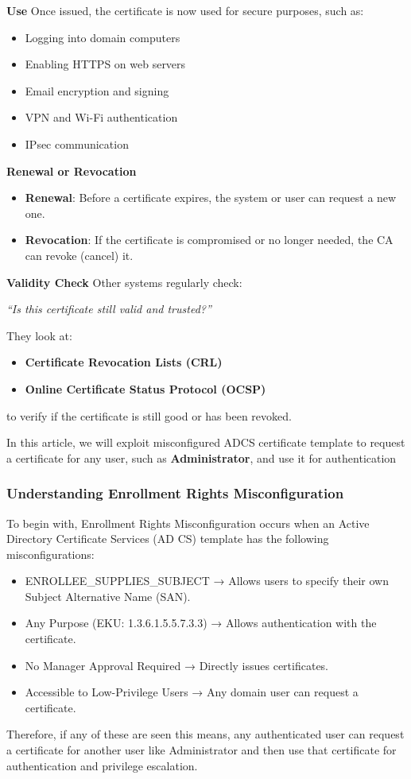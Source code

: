 \textbf{Use}
Once issued, the certificate is now used for secure purposes, such as:

\begin{itemize}
    \item Logging into domain computers
    \item Enabling HTTPS on web servers
    \item Email encryption and signing
    \item VPN and Wi-Fi authentication
    \item IPsec communication
\end{itemize}

\textbf{Renewal or Revocation}

\begin{itemize}
    \item \textbf{Renewal}: Before a certificate expires, the system or user can request a new one.
    \item \textbf{Revocation}: If the certificate is compromised or no longer needed, the CA can revoke (cancel) it.
\end{itemize}

\textbf{Validity Check}
Other systems regularly check:

\textit{“Is this certificate still valid and trusted?”}

They look at:

\begin{itemize}
    \item \textbf{Certificate Revocation Lists (CRL)}
    \item \textbf{Online Certificate Status Protocol (OCSP)}
\end{itemize}
to verify if the certificate is still good or has been revoked.

In this article, we will exploit misconfigured ADCS certificate template to request a certificate for any user, such as \textbf{Administrator}, and use it for authentication

\subsubsection{Understanding Enrollment Rights Misconfiguration}

To begin with, Enrollment Rights Misconfiguration occurs when an Active Directory Certificate Services (AD CS) template has the following misconfigurations:

\begin{itemize}
    \item ENROLLEE\_SUPPLIES\_SUBJECT → Allows users to specify their own Subject Alternative Name (SAN).
    \item Any Purpose (EKU: 1.3.6.1.5.5.7.3.3) → Allows authentication with the certificate.
    \item No Manager Approval Required → Directly issues certificates.
    \item Accessible to Low-Privilege Users → Any domain user can request a certificate.
\end{itemize}
Therefore, if any of these are seen this means, any authenticated user can request a certificate for another user like Administrator and then use that certificate for authentication and privilege escalation.

